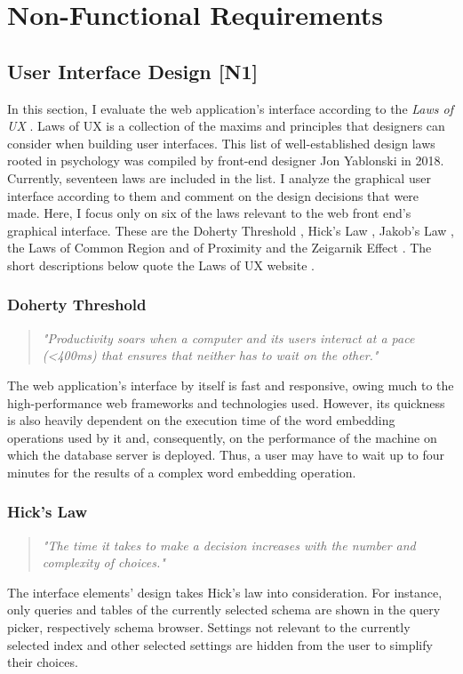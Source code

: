 \section{Non-Functional Requirements}
\label{sec:nf_req}
\subsection{User Interface Design [N1]}
In this section, I evaluate the web application's interface according to the \textit{Laws of UX} \cite{laws-of-ux}. Laws of UX is a collection of the maxims and principles that designers can consider when building user interfaces. This list of well-established design laws rooted in psychology was compiled by front-end designer Jon Yablonski in 2018. Currently, seventeen laws are included in the list. I analyze the graphical user interface according to them and comment on the design decisions that were made. Here, I focus only on six of the laws relevant to the web front end's graphical interface. These are the Doherty Threshold \cite{doherty1982economic}, Hick's Law \cite{hick1952rate} \cite{hyman1953stimulus}, Jakob's Law \cite{jakob}, the Laws of Common Region and of Proximity \cite{palmer1992common} and the Zeigarnik Effect \cite{zeigarnik1927behalten}. The short descriptions below quote the Laws of UX website \cite{laws-of-ux}.

\subsubsection{Doherty Threshold}
\begin{quote}
	\textit{"Productivity soars when a computer and its users interact at a pace (<400ms) that ensures that neither has to wait on the other."} 
\end{quote}
The web application's interface by itself is fast and responsive, owing much to the high-performance web frameworks and technologies used. However, its quickness is also heavily dependent on the execution time of the word embedding operations used by it and, consequently, on the performance of the machine on which the database server is deployed. Thus, a user may have to wait up to four minutes for the results of a complex word embedding operation. 

\subsubsection{Hick’s Law}
\begin{quote}
	\textit{"The time it takes to make a decision increases with the number and complexity of choices."} 
\end{quote}
The interface elements' design takes Hick's law into consideration. For instance, only queries and tables of the currently selected schema are shown in the query picker, respectively schema browser. Settings not relevant to the currently selected index and other selected settings are hidden from the user to simplify their choices.

